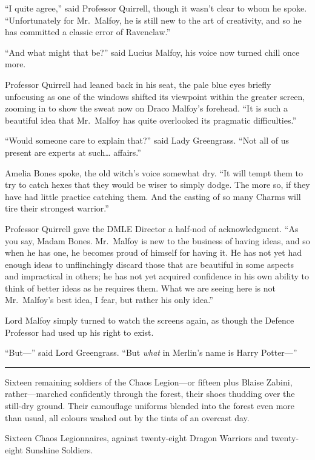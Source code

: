 ``I quite agree,'' said Professor Quirrell, though it wasn't clear to
whom he spoke. ``Unfortunately for Mr.~Malfoy, he is still new to the
art of creativity, and so he has committed a classic error of
Ravenclaw.''

``And what might that be?'' said Lucius Malfoy, his voice now turned
chill once more.

Professor Quirrell had leaned back in his seat, the pale blue eyes
briefly unfocusing as one of the windows shifted its viewpoint within
the greater screen, zooming in to show the sweat now on Draco Malfoy's
forehead. ``It is such a beautiful idea that Mr.~Malfoy has quite
overlooked its pragmatic difficulties.''

``Would someone care to explain that?'' said Lady Greengrass. ``Not all
of us present are experts at such\ldots{} affairs.''

Amelia Bones spoke, the old witch's voice somewhat dry. ``It will tempt
them to try to catch hexes that they would be wiser to simply dodge. The
more so, if they have had little practice catching them. And the casting
of so many Charms will tire their strongest warrior.''

Professor Quirrell gave the DMLE Director a half-nod of acknowledgment.
``As you say, Madam Bones. Mr.~Malfoy is new to the business of having
ideas, and so when he has one, he becomes proud of himself for having
it. He has not yet had enough ideas to unflinchingly discard those that
are beautiful in some aspects and impractical in others; he has not yet
acquired confidence in his own ability to think of better ideas as he
requires them. What we are seeing here is not Mr.~Malfoy's best idea, I
fear, but rather his only idea.''

Lord Malfoy simply turned to watch the screens again, as though the
Defence Professor had used up his right to exist.

``But---'' said Lord Greengrass. ``But \emph{what} in Merlin's name is
Harry Potter---''

\begin{center}\rule{3in}{0.4pt}\end{center}

Sixteen remaining soldiers of the Chaos Legion---or fifteen plus Blaise
Zabini, rather---marched confidently through the forest, their shoes
thudding over the still-dry ground. Their camouflage uniforms blended
into the forest even more than usual, all colours washed out by the
tints of an overcast day.

Sixteen Chaos Legionnaires, against twenty-eight Dragon Warriors and
twenty-eight Sunshine Soldiers.

